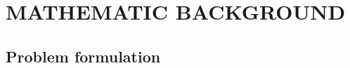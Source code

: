 \documentclass[12pt,a4paper]{article}
\begin{document}
\newpage
\section{MATHEMATIC BACKGROUND}\label{sec:mathematic_background}
  \subsection{Problem formulation}
  \label{sec:problem_formulation}
  






\end{document}
